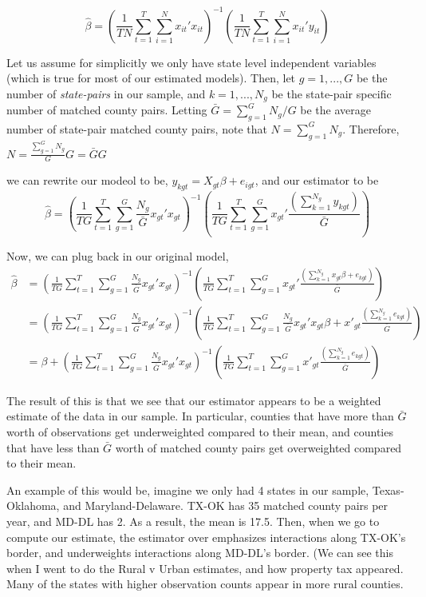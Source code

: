 \documentclass{article}
\begin{document}
$$\hat \beta = (\frac{1}{TN}\sum_{t=1}^{T}\sum_{i=1}^{N}x_{it}'x_{it})^{-1}(\frac{1}{TN}\sum_{t=1}^{T}\sum_{i=1}^{N}x_{it}'y_{it})$$

Let us assume for simplicitly we only have state level independent variables (which is true for most of our estimated models). Then, let $g = 1,...,G$ be the number of \textit{state-pairs} in our sample, and $k = 1,...,N_{g}$ be the state-pair specific number of matched county pairs. Letting $\bar G = \sum_{g=1}^{G}N_{g}/G$ be the average number of state-pair matched county pairs, note that $N = \sum_{g=1}^{G}N_{g}$. Therefore, $N = \frac{\sum_{g=1}^{G}N_{g}}{G}G = \bar G G$

we can rewrite our modeol to be, $y_{kgt} = X_{gt}\beta+e_{igt}$, and our estimator to be
$$\hat \beta = (\frac{1}{TG}\sum_{t=1}^{T}\sum_{g=1}^{G}\frac{N_{g}}{\bar G}x_{gt}'x_{gt})^{-1}(\frac{1}{TG}\sum_{t=1}^{T}\sum_{g=1}^{G}x_{gt}'\frac{(\sum_{k=1}^{N_{g}}y_{kgt})}{\bar G})$$

Now, we can plug back in our original model,
\begin{align*}\hat \beta &= (\frac{1}{TG}\sum_{t=1}^{T}\sum_{g=1}^{G}\frac{N_{g}}{\bar G}x_{gt}'x_{gt})^{-1}(\frac{1}{TG}\sum_{t=1}^{T}\sum_{g=1}^{G}x_{gt}'\frac{(\sum_{k=1}^{N_{g}}x_{gt}\beta+e_{kgt})}{\bar G}) \\
 &=  (\frac{1}{TG}\sum_{t=1}^{T}\sum_{g=1}^{G}\frac{N_{g}}{\bar G}x_{gt}'x_{gt})^{-1}(\frac{1}{TG}\sum_{t=1}^{T}\sum_{g=1}^{G}\frac{N_{g}}{\bar G}x_{gt}'x_{gt}\beta +x'_{gt}\frac{(\sum_{k=1}^{N_{g}}e_{kgt})}{\bar G}) \\
 &= \beta + (\frac{1}{TG}\sum_{t=1}^{T}\sum_{g=1}^{G}\frac{N_{g}}{\bar G}x_{gt}'x_{gt})^{-1}(\frac{1}{TG}\sum_{t=1}^{T}\sum_{g=1}^{G}x'_{gt}\frac{(\sum_{k=1}^{N_{g}}e_{kgt})}{\bar G}) \end{align*}

The result of this is that we see that our estimator appears to be a weighted estimate of the data in our sample. In particular, counties that have more than $\bar G$ worth of observations get underweighted compared to their mean, and counties that have less than $\bar G$ worth of matched county pairs get overweighted compared to their mean.

An example of this would be, imagine we only had 4 states in our sample, Texas-Oklahoma, and Maryland-Delaware. TX-OK has 35 matched county pairs per year, and MD-DL has 2. As a result, the mean is 17.5. Then, when we go to compute our estimate, the estimator over emphasizes interactions along TX-OK's border, and underweights interactions along MD-DL's border. (We can see this when I went to do the Rural v Urban estimates, and how property tax appeared. Many of the states with higher observation counts appear in more rural counties.
\end{document}
